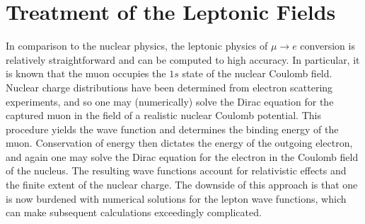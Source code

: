 \documentclass{book}[letterpaper,12pt]
\begin{document}
\chapter{Treatment of the Leptonic Fields}
\label{chap:leptonic}
\thispagestyle{headings}
In comparison to the nuclear physics, the leptonic physics of $\mu\rightarrow e$ conversion is relatively straightforward and can be computed to high accuracy. In particular, it is known that the muon occupies the $1s$ state of the nuclear Coulomb field. 
Nuclear charge distributions have been determined from electron scattering experiments, and so one may (numerically) solve the Dirac equation for the captured muon in the field of a realistic nuclear Coulomb potential. This procedure yields the wave function and determines the binding energy of the muon. Conservation of energy then dictates the energy of the outgoing electron, and again one may solve the Dirac equation for the electron in the Coulomb field of the nucleus. The resulting wave functions account for relativistic effects and the finite extent of the nuclear charge. The downside of this approach is that one is now burdened with numerical solutions for the lepton wave functions, which can make subsequent calculations exceedingly complicated.
\end{document}
